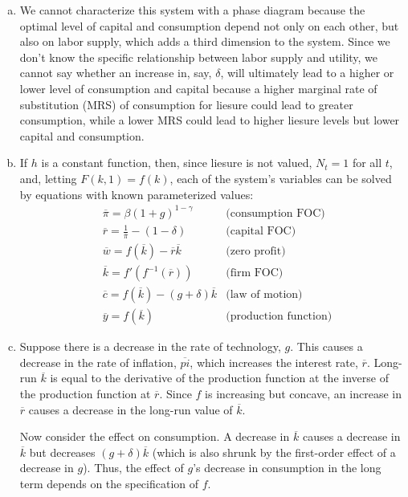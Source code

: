 \documentclass{article}
\begin{document}
\begin{enumerate}[(a)]
	\item We cannot characterize this system with a phase diagram because the optimal level of capital and consumption depend not only on each other, but also on labor supply, which adds a third dimension to the system. Since we don't know the specific relationship between labor supply and utility, we cannot say whether an increase in, say, $\delta$, will ultimately lead to a higher or lower level of consumption and capital because a higher marginal rate of substitution (MRS) of consumption for liesure could lead to greater consumption, while a lower MRS could lead to higher liesure levels but lower capital and consumption.
	
	\item If $h$ is a constant function, then, since liesure is not valued, $N_t=1$ for all $t$, and, letting ${F(k,1)=f(k)}$, each of the system's variables can be solved by equations with known parameterized values:
		\begin{align*}
			& \overline{\pi}	= \beta(1+g)^{1-\gamma}						&\text{(consumption FOC)} 		\\
			& \overline{r}   	= \frac{1}{\overline{\pi}} - (1 - \delta)	&\text{(capital  FOC)} 			\\
			& \overline{w} 		= f(\overline{k}) -\overline{r}\overline{k}	&\text{(zero profit)} 			\\
			& \overline{k} 		= f'(f^{-1}(\overline{r}))					&\text{(firm FOC)}				\\
			& \overline{c} 		= f(\overline{k}) - (g+\delta)\overline{k}	&\text{(law of motion)}		 	\\
			& \overline{y} 		= f(\overline{k}) 							&\text{(production function)}	
		\end{align*}
	
	\item Suppose there is a decrease in the rate of technology, $g$. This causes a decrease in the rate of inflation, $\overline{pi}$, which increases the interest rate, $\overline{r}$. Long-run $\overline{k}$ is equal to the derivative of the production function at the inverse of the production function at $\overline{r}$. Since $f$ is increasing but concave, an increase in $\overline{r}$ causes a decrease in the long-run value of $\overline{k}$.
	
	Now consider the effect on consumption. A decrease in $\overline{k}$ causes a decrease in $\overline{k}$ but decreases $(g+\delta)\overline{k}$ (which is also shrunk by the first-order effect of a decrease in $g$). Thus, the effect of $g$'s decrease in consumption in the long term depends on the specification of $f$.
	

\end{enumerate}
\end{document}
